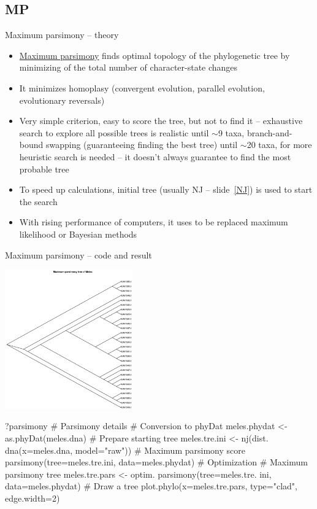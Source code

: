 \documentclass[compress, ucs, xelatex, 11pt, xcolor=svgnames,
  hyperref={
    bookmarks=true,
    unicode=true,
    colorlinks=true,
    pdftitle={Molecular data in R},
    plainpages=false,
    pdfauthor={Vojtech Zeisek},
    pdfsubject={Course about phylogeny and evolution in R},
    pdfcreator={XeLaTeX},
    pdfkeywords={R, evolution, phylogeny, molecular data},
    linkcolor=Tomato,
    anchorcolor=SaddleBrown,
    citecolor=Goldenrod,
    filecolor=DarkMagenta,
    menucolor=Sienna,
    urlcolor=DarkTurquoise,
    pdftex},
  url={hyphens, lowtilde} %
  ]{beamer}
\begin{document}
\subsection{MP}

\begin{frame}{Maximum parsimony -- theory}
  \label{MP}
  \begin{itemize}
    \item \href{https://en.wikipedia.org/wiki/Maximum_parsimony_(phylogenetics)}{Maximum parsimony} finds optimal topology of the phylogenetic tree by minimizing of the total number of character-state changes
    \item It minimizes homoplasy (convergent evolution, parallel evolution, evolutionary reversals)
    \item Very simple criterion, easy to score the tree, but not to find it -- exhaustive search to explore all possible trees is realistic until $\sim$9 taxa, branch-and-bound swapping (guaranteeing finding the best tree) until $\sim$20 taxa, for more heuristic search is needed -- it doesn't always guarantee to find the most probable tree
    \item To speed up calculations, initial tree (usually NJ -- slide~\ref{NJ}) is used to start the search
    \item With rising performance of computers, it uses to be replaced maximum likelihood or Bayesian methods
  \end{itemize}
\end{frame}

\begin{frame}[fragile]{Maximum parsimony -- code and result}
\begin{multicols}{2}
  \vfil
  \includegraphics[height=6cm]{parsimony.png}
  \vfil
  \begin{spluscode}
    ?parsimony # Parsimony details
    # Conversion to phyDat
    meles.phydat <-
      as.phyDat(meles.dna)
    # Prepare starting tree
    meles.tre.ini <- nj(dist.
      dna(x=meles.dna, model="raw"))
    # Maximum parsimony score
    parsimony(tree=meles.tre.ini,
      data=meles.phydat)
    # Optimization
    # Maximum parsimony tree
    meles.tre.pars <- optim.
      parsimony(tree=meles.tre.
      ini, data=meles.phydat)
    # Draw a tree
    plot.phylo(x=meles.tre.pars,
      type="clad", edge.width=2)
  \end{spluscode}
\end{multicols}
\end{frame}
\end{document}
